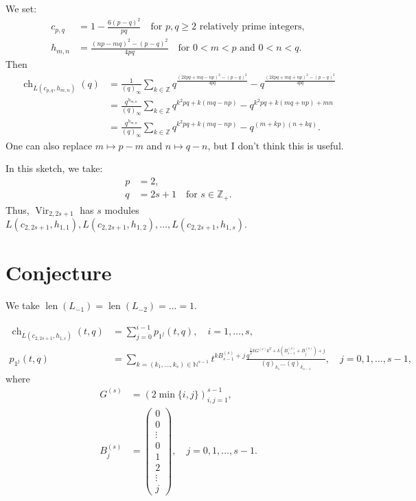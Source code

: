 \documentclass[a4paper, 12pt, reqno]{amsart}
\DeclareMathOperator{\Vir}{Vir}
\DeclareMathOperator{\ch}{ch}
\DeclareMathOperator{\len}{len}
\begin{document}
We set:
\begin{align*}
  c_{p, q} &= 1 - \frac{6(p - q)^2}{pq} \quad \text{for $p, q \ge 2$ relatively prime integers}, \\
  h_{m, n} &= \frac{(np - mq)^2 - (p - q)^2}{4pq} \quad \text{for $0 < m < p$ and $0 < n < q$.}
\end{align*}
Then
\begin{align*}
  \ch_{L(c_{p, q}, h_{m, n})}(q) &= \frac{1}{(q)_{\infty}}\sum_{k \in \mathbb{Z}}q^{\frac{(2kpq + mq - np)^2 - (p - q)^2}{4pq}} - q^{\frac{(2kpq + mq + np)^2 - (p - q)^2}{4pq}} \\
                                 &= \frac{q^{h_{m, n}}}{(q)_{\infty}}\sum_{k \in \mathbb{Z}}q^{k^2pq + k(mq - np)}-q^{k^2pq + k(mq + np) + mn} \\
                                 &= \frac{q^{h_{m, n}}}{(q)_{\infty}}\sum_{k \in \mathbb{Z}}q^{k^2pq + k(mq - np)}-q^{(m + kp)(n + kq)}.
\end{align*}
One can also replace $m \mapsto p - m$ and $n \mapsto q - n$, but I don't think this is useful.

In this sketch, we take:
\begin{align*}
  p &= 2, \\
  q &= 2s + 1 \quad \text{for $s \in \mathbb{Z}_+$}.
\end{align*}
Thus, $\Vir_{2, 2s + 1}$ has $s$ modules $L(c_{2, 2s + 1}, h_{1, 1}), L(c_{2, 2s + 1}, h_{1, 2}), \dots, L(c_{2, 2s + 1}, h_{1, s})$.

\section{Conjecture}
\label{sec:conjecture}

We take $\len(L_{-1}) = \len(L_{-2}) = \dots = 1$.

\begin{align*}
  \ch_{L(c_{2, 2s + 1}, h_{1, i})}(t, q) &= \sum_{j = 0}^{i - 1}p_{1^j}(t, q), \quad i = 1, \dots, s, \\
  p_{1^j}(t, q) &= \sum_{k = (k_1, \dots, k_s) \in \mathbb{N}^{s - 1}}t^{kB^{(s)}_{s - 1} + j}\frac{q^{\frac{1}{2}kG^{(s)}k^T + k(B^{(s)}_{s - 1} + B^{(s)}_j) + j}}{(q)_{k_1}\dots(q)_{k_{s - 1}}}, \quad j = 0, 1, \dots, s - 1,
\end{align*}
where
\begin{align*}
  G^{(s)} &= (2\min\{i, j\})_{i, j = 1}^{s - 1}, \\
  B^{(s)}_j &=
              \left(\begin{smallmatrix}
                0 \\
                0 \\
                \vdots \\
                0 \\
                1 \\
                2 \\
                \vdots \\
                j
              \end{smallmatrix}\right), \quad j = 0, 1, \dots, s - 1.  
\end{align*}
\end{document}
